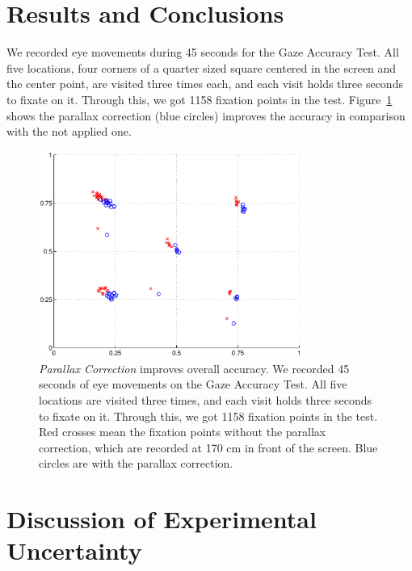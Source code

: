 \documentclass{article}
\begin{document}
\section{Results and Conclusions}

We recorded eye movements during 45 seconds for the Gaze Accuracy Test. All five locations, four corners of a quarter sized square centered in the screen and the center point, are visited three times each, and each visit holds three seconds to fixate on it. Through this, we got 1158 fixation points in the test. Figure~\ref{fig:parallax-correction} shows the parallax correction (blue circles) improves the accuracy in comparison with the not applied one.

\begin{figure}
  \centerline{\includegraphics[width=86mm,trim=10mm 10mm 10mm 10mm]{./eps/parallax_correction.eps}}
  \caption{\textit{Parallax Correction} improves overall accuracy. We recorded 45 seconds of eye movements on the Gaze Accuracy Test. All five locations are visited three times, and each visit holds three seconds to fixate on it. Through this, we got 1158 fixation points in the test. Red crosses mean the fixation points without the parallax correction, which are recorded at 170 cm in front of the screen. Blue circles are with the parallax correction.}
  \label{fig:parallax-correction}
\end{figure}


\section{Discussion of Experimental Uncertainty}
\end{document}

